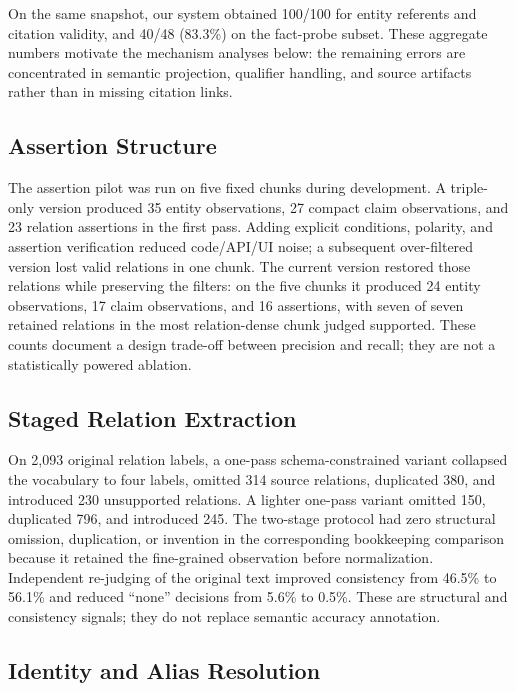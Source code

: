 \documentclass[11pt]{article}
\begin{document}
On the same snapshot, our system obtained 100/100 for entity referents and citation validity, and 40/48 (83.3\%) on the fact-probe subset. These aggregate numbers motivate the mechanism analyses below: the remaining errors are concentrated in semantic projection, qualifier handling, and source artifacts rather than in missing citation links.

\subsection{Assertion Structure}

The assertion pilot was run on five fixed chunks during development. A triple-only version produced 35 entity observations, 27 compact claim observations, and 23 relation assertions in the first pass. Adding explicit conditions, polarity, and assertion verification reduced code/API/UI noise; a subsequent over-filtered version lost valid relations in one chunk. The current version restored those relations while preserving the filters: on the five chunks it produced 24 entity observations, 17 claim observations, and 16 assertions, with seven of seven retained relations in the most relation-dense chunk judged supported. These counts document a design trade-off between precision and recall; they are not a statistically powered ablation.

\subsection{Staged Relation Extraction}

On 2,093 original relation labels, a one-pass schema-constrained variant collapsed the vocabulary to four labels, omitted 314 source relations, duplicated 380, and introduced 230 unsupported relations. A lighter one-pass variant omitted 150, duplicated 796, and introduced 245. The two-stage protocol had zero structural omission, duplication, or invention in the corresponding bookkeeping comparison because it retained the fine-grained observation before normalization. Independent re-judging of the original text improved consistency from 46.5\% to 56.1\% and reduced ``none'' decisions from 5.6\% to 0.5\%. These are structural and consistency signals; they do not replace semantic accuracy annotation.

\subsection{Identity and Alias Resolution}
\end{document}
